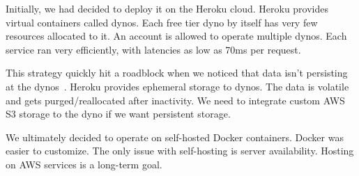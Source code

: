 Initially, we had decided to deploy it on the Heroku cloud. Heroku provides virtual containers called dynos. Each free tier dyno by itself has very few resources allocated to it. An account is allowed to operate multiple dynos. Each service ran very efficiently, 
with latencies as low as 70ms per request.

This strategy quickly hit a roadblock when we noticed that data isn't persisting at the dynos~\cite{HerokuActiveStorage}. 
Heroku provides ephemeral storage to dynos. The data is volatile and gets purged/reallocated after inactivity.
We need to integrate custom AWS S3 storage to the dyno if we want persistent storage. 

We ultimately decided to operate on self-hosted Docker containers. Docker was easier to customize. The only issue with self-hosting is server availability. Hosting on AWS services is a long-term goal.